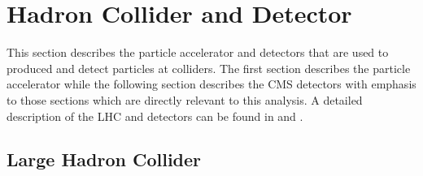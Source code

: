\chapter{Hadron Collider and Detector}
This section describes the particle accelerator and detectors that are used to produced and detect particles at colliders. The first section describes the particle accelerator while the following section describes the CMS detectors with emphasis to those sections which are directly relevant to this analysis. A detailed description of the LHC and detectors can be found in \cite{LHC} and \cite{CMSD}.
\section{Large Hadron Collider}
